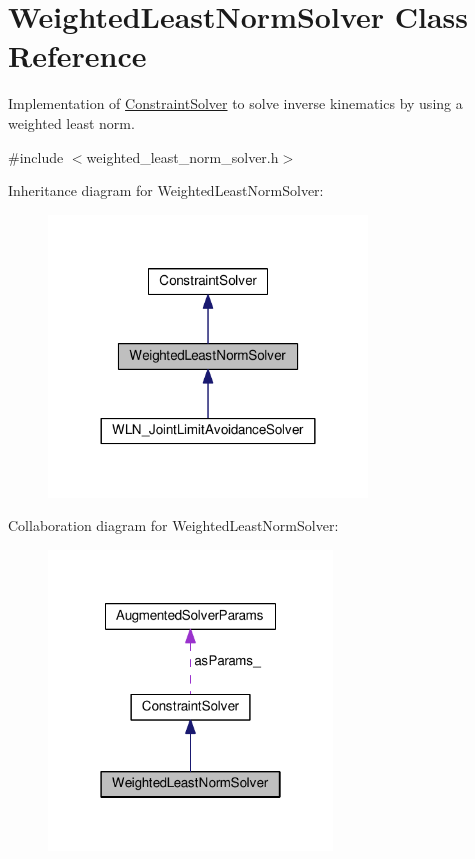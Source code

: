 \hypertarget{classWeightedLeastNormSolver}{\section{Weighted\-Least\-Norm\-Solver Class Reference}
\label{classWeightedLeastNormSolver}
}


Implementation of \hyperlink{classConstraintSolver}{Constraint\-Solver} to solve inverse kinematics by using a weighted least norm.  




{\ttfamily \#include $<$weighted\-\_\-least\-\_\-norm\-\_\-solver.\-h$>$}



Inheritance diagram for Weighted\-Least\-Norm\-Solver\-:
\nopagebreak
\begin{figure}[H]
\begin{center}
\leavevmode
\includegraphics[width=240pt]{classWeightedLeastNormSolver__inherit__graph}
\end{center}
\end{figure}


Collaboration diagram for Weighted\-Least\-Norm\-Solver\-:
\nopagebreak
\begin{figure}[H]
\begin{center}
\leavevmode
\includegraphics[width=214pt]{classWeightedLeastNormSolver__coll__graph}
\end{center}
\end{figure}
